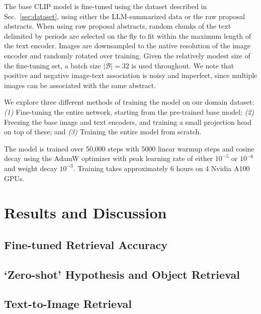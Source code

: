 \documentclass[10pt]{article} %
\begin{document}
The base CLIP model is fine-tuned using the dataset described in Sec.~\ref{sec:dataset}, using either the LLM-summarized data or the raw proposal abstracts. When using raw proposal abstracts, random chunks of the text delimited by periods are selected on the fly to fit within the maximum length of the text encoder. Images are downsampled to the native resolution of the image encoder and randomly rotated over training. Given the relatively modest size of the fine-tuning set, a batch size $|\mathcal B| = 32$ is used throughout. We note that positive and negative image-text association is noisy and imperfect, since multiple images can be associated with the same abstract.

We explore three different methods of training the model on our domain dataset: \emph{(1)} Fine-tuning the entire network, starting from the pre-trained base model; \emph{(2)} Freezing the base image and text encoders, and training a small projection head on top of these; and \emph{(3)} Training the entire model from scratch.

The model is trained over 50,000 steps with 5000 linear warmup steps and cosine decay using the AdamW optimizer \citep{DBLP:conf/iclr/LoshchilovH19,DBLP:journals/corr/KingmaB14} with peak learning rate of either $10^{-5}$ or $10^{-6}$ and weight decay $10^{-3}$. Training takes approximately 6 hours on 4 Nvidia A100 GPUs.

\section{Results and Discussion}
\label{sec:results}


\subsection{Fine-tuned Retrieval Accuracy}
\label{sec:retrieval_acc}

\subsection{`Zero-shot' Hypothesis and Object Retrieval}
\label{sec:zero_shot}

\subsection{Text-to-Image Retrieval}
\label{sec:tti}
\end{document}
